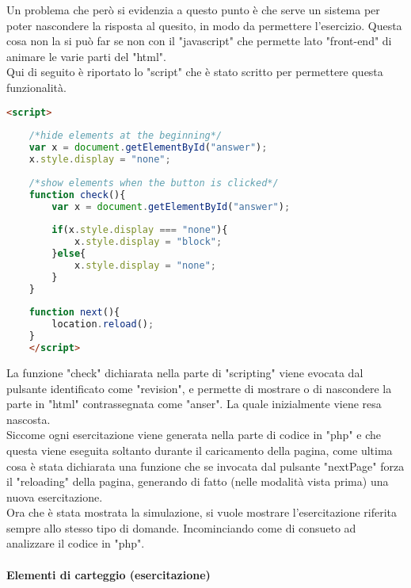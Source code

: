 Un problema che però si evidenzia a questo punto è che serve un sistema per poter nascondere la risposta al quesito, in modo da permettere l'esercizio. Questa cosa non la si può far se non con il "javascript" che permette lato "front-end" di animare le varie parti del "html".\\
Qui di seguito è riportato lo "script" che è stato scritto per permettere questa funzionalità.\\

\begin{lstlisting}[language=html]
	<script>
	
	/*hide elements at the beginning*/
	var x = document.getElementById("answer");
	x.style.display = "none";
	
	/*show elements when the button is clicked*/
	function check(){
		var x = document.getElementById("answer");
		
		if(x.style.display === "none"){
			x.style.display = "block";
		}else{
			x.style.display = "none";
		}	
	}
	
	function next(){
		location.reload();  
	}
	</script>
\end{lstlisting}

La funzione "check" dichiarata nella parte di "scripting" viene evocata dal pulsante identificato come "revision", e permette di mostrare o di nascondere la parte in "html" contrassegnata come "anser". La quale inizialmente viene resa nascosta.\\
Siccome ogni esercitazione viene generata nella parte di codice in "php" e che questa viene eseguita soltanto durante il caricamento della pagina, come ultima cosa è stata dichiarata una funzione che se invocata dal pulsante "nextPage" forza il "reloading" della pagina, generando di fatto (nelle modalità vista prima) una nuova esercitazione.\\

Ora che è stata mostrata la simulazione, si vuole mostrare l'esercitazione riferita sempre allo stesso tipo di domande. Incominciando come di consueto ad analizzare il codice in "php".
\paragraph{Elementi di carteggio (esercitazione)}\leavevmode\\

